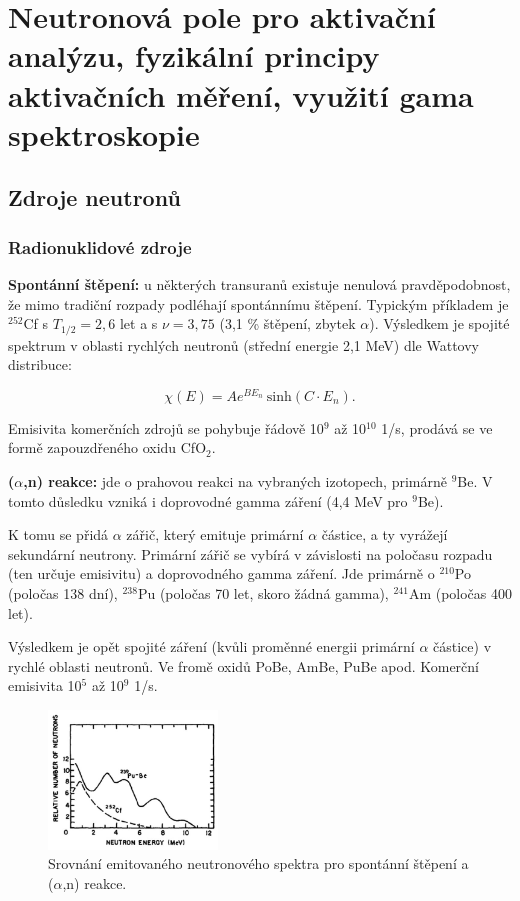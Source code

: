 \section[Aktivační měření, gama spektroskopie]{Neutronová pole pro aktivační analýzu, fyzikální principy aktivačních měření, využití gama spektroskopie}

\subsection{Zdroje neutronů}

\subsubsection{Radionuklidové zdroje}

\textbf{Spontánní štěpení:} u některých transuranů existuje nenulová pravděpodobnost, že mimo tradiční rozpady podléhají spontánnímu štěpení. Typickým příkladem je $^{252}$Cf s $T_{1/2} = 2,6$ let a s $\nu = 3,75$ (3,1 \% štěpení, zbytek $\alpha$). Výsledkem je spojité spektrum v oblasti rychlých neutronů (střední energie 2,1 MeV) dle Wattovy distribuce:

$$ \chi(E) = A e^{B E_n} \: \text{sinh} (C \cdot E_n). $$

Emisivita komerčních zdrojů se pohybuje řádově 10$^9$ až 10$^{10}$ 1/s, prodává se ve formě zapouzdřeného oxidu CfO$_2$.

\textbf{($\alpha$,n) reakce:} jde o prahovou reakci na vybraných izotopech, primárně $^9$Be. V tomto důsledku vzniká i doprovodné gamma záření (4,4 MeV pro $^9$Be).

K tomu se přidá $\alpha$ zářič, který emituje primární $\alpha$ částice, a ty vyrážejí sekundární neutrony. Primární zářič se vybírá v závislosti na poločasu rozpadu (ten určuje emisivitu) a doprovodného gamma záření. Jde primárně o $^{210}$Po (poločas 138 dní), $^{238}$Pu (poločas 70 let, skoro žádná gamma), $^{241}$Am (poločas 400 let).

Výsledkem je opět spojité záření (kvůli proměnné energii primární $\alpha$ částice) v rychlé oblasti neutronů. Ve fromě oxidů PoBe, AmBe, PuBe apod. Komerční emisivita 10$^5$ až 10$^9$ 1/s.

\begin{figure}[H]
    \centering
    \includegraphics[width=0.4\textwidth]{img/zdroje_E.JPG}
    \caption{Srovnání emitovaného neutronového spektra pro spontánní štěpení a ($\alpha$,n) reakce.}
\end{figure}

